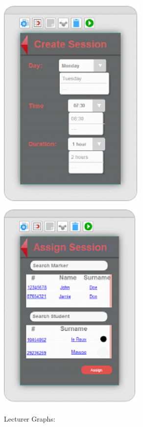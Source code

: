 \documentclass{article}
\begin{document}
\noindent \includegraphics*[width=2.87in, height=4.28in, keepaspectratio=false]{image21}       \includegraphics*[width=2.83in, height=4.19in, keepaspectratio=false]{image22}     

\noindent 

     Lecturer Graphs:
\end{document}
